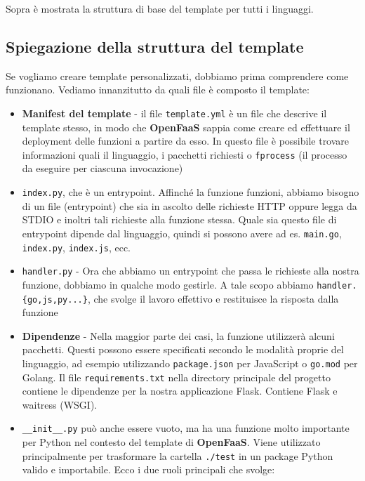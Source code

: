 \documentclass[11pt, a4paper]{article}
\begin{document}
Sopra è mostrata la struttura di base del template per tutti i linguaggi.

\subsection*{Spiegazione della struttura del template}

Se vogliamo creare template personalizzati, dobbiamo prima comprendere come funzionano. Vediamo innanzitutto da quali file è composto il template:
\begin{itemize}[noitemsep]
    \item \textbf{Manifest del template} - il file \texttt{template.yml} è un file che descrive il template stesso, in modo che \textbf{OpenFaaS} sappia come creare ed effettuare il deployment delle funzioni a partire da esso. In questo file è possibile trovare informazioni quali il linguaggio, i pacchetti richiesti o \texttt{fprocess} (il processo da eseguire per ciascuna invocazione)
    \item \texttt{index.py}, che è un entrypoint. Affinché la funzione funzioni, abbiamo bisogno di un file (entrypoint) che sia in ascolto delle richieste HTTP oppure legga da STDIO e inoltri tali richieste alla funzione stessa. Quale sia questo file di entrypoint dipende dal linguaggio, quindi si possono avere ad es. \texttt{main.go}, \texttt{index.py}, \texttt{index.js}, ecc.
    \item \texttt{handler.py} - Ora che abbiamo un entrypoint che passa le richieste alla nostra funzione, dobbiamo in qualche modo gestirle. A tale scopo abbiamo \texttt{handler.\{go,js,py...\}}, che svolge il lavoro effettivo e restituisce la risposta dalla funzione
    \item \textbf{Dipendenze} - Nella maggior parte dei casi, la funzione utilizzerà alcuni pacchetti. Questi possono essere specificati secondo le modalità proprie del linguaggio, ad esempio utilizzando \texttt{package.json} per JavaScript o \texttt{go.mod} per Golang. Il file \texttt{requirements.txt} nella directory principale del progetto contiene le dipendenze per la nostra applicazione Flask. Contiene Flask e waitress (WSGI).
    \item \texttt{\_\_init\_\_.py} può anche essere vuoto, ma ha una funzione molto importante per Python nel contesto del template di \textbf{OpenFaaS}. Viene utilizzato principalmente per trasformare la cartella \texttt{./test} in un package Python valido e importabile. Ecco i due ruoli principali che svolge:
    \begin{itemize}[noitemsep]

\end{itemize}
\end{itemize}
\end{document}
